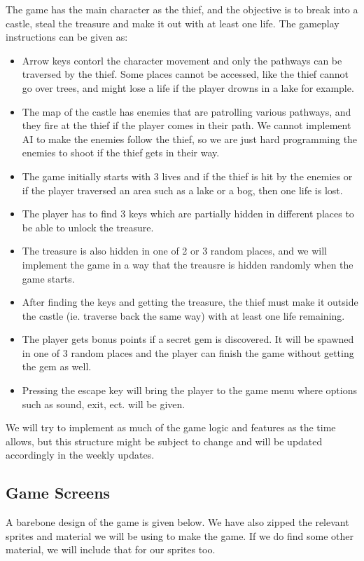 \documentclass[12pt,a4paper]{article}
\begin{document}
The game has the main character as the thief, and the objective is to break into a castle, steal the treasure and make it out with at least one life. The gameplay instructions can be given as:
\begin{itemize}
    \item Arrow keys contorl the character movement and only the pathways can be traversed by the thief. Some places cannot be accessed, like the thief cannot go over trees, and might lose a life if the player drowns in a lake for example.
    \item The map of the castle has enemies that are patrolling various pathways, and they fire at the thief if the player comes in their path. We cannot implement AI to make the enemies follow the thief, so we are just hard programming the enemies to shoot if the thief gets in their way.
    \item The game initially starts with 3 lives and if the thief is hit by the enemies or if the player traversed an area such as a lake or a bog, then one life is lost. 
    \item The player has to find 3 keys which are partially hidden in different places to be able to unlock the treasure.
    \item The treasure is also hidden in one of 2 or 3 random places, and we will implement the game in a way that the treausre is hidden randomly when the game starts.
    \item After finding the keys and getting the treasure, the thief must make it outside the castle (ie. traverse back the same way) with at least one life remaining.
    \item The player gets bonus points if a secret gem is discovered. It will be spawned in one of 3 random places and the player can finish the game without getting the gem as well.
    \item Pressing the escape key will bring the player to the game menu where options such as sound, exit, ect. will be given.
\end{itemize}
We will try to implement as much of the game logic and features as the time allows, but this structure might be subject to change and will be updated accordingly in the weekly updates.

\subsection{Game Screens}\label{sec:game screens}

A barebone design of the game is given below. We have also zipped the relevant sprites and material we will be using to make the game. If we do find some other material, we will include that for our sprites too.
\end{document}
